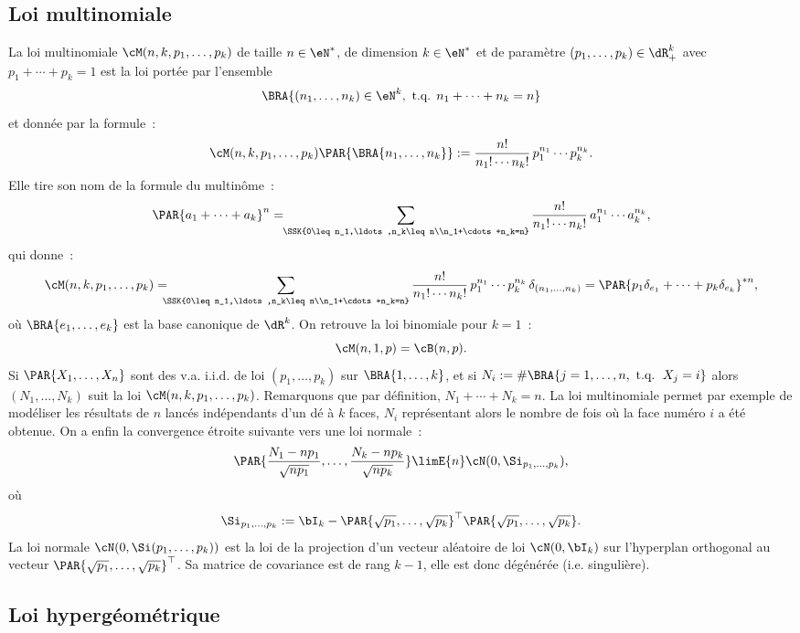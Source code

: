 %
\subsection{Loi multinomiale}\label{ss:loi:multinomiale}
%

La loi multinomiale $\cM(n,k,p_1,\ldots,p_k)$ de taille $n\in\eN^*$, de dimension
$k\in\eN^*$ et de paramètre $(p_1,\ldots,p_k)\in\dR_+^k$ 
avec $p_1+\cdots+p_k=1$ est la loi portée par l'ensemble
$$
\BRA{(n_1,\ldots,n_k) \in \eN^k, \text{ t.q. } n_1+\cdots+n_k=n}
$$
et donnée par la formule~:
$$
\cM(n,k,p_1,\ldots,p_k)\PAR{\BRA{n_1,\ldots,n_k}}
:=\frac{n!}{n_1!\cdots n_k!}\,p_1^{n_1}\cdots p_k^{n_k}.
$$
Elle tire son nom de la formule du multinôme~: 
$$
\PAR{a_1+\cdots+a_k}^n=
\!\!\sum_{\SSK{0\leq n_1,\ldots,n_k\leq n\\n_1+\cdots+n_k=n}} 
\frac{n!}{n_1!\cdots n_k!}\,a_1^{n_1}\cdots a_k^{n_k}, 
$$
qui donne~:
$$
\cM(n,k,p_1,\ldots,p_k) = 
\!\!\!\!\sum_{\SSK{0\leq n_1,\ldots,n_k\leq n\\n_1+\cdots+n_k=n}} 
\frac{n!}{n_1!\cdots n_k!}\,p_1^{n_1}\cdots p_k^{n_k} 
\,\delta_{(n_1,\ldots,n_k)} = \PAR{p_1\delta_{e_1}+\cdots+p_k\delta_{e_k}}^{*n},
$$
où $\BRA{e_1,\ldots,e_k}$ est la base canonique de $\dR^k$.
On retrouve la loi binomiale pour $k=1$~: 
$$
\cM(n,1,p)=\cB(n,p).
$$
Si $\PAR{X_1,\ldots,X_n}$ sont des v.a. i.i.d. de loi $(p_1,\ldots,p_k)$ sur 
$\BRA{1,\ldots,k}$, et si 
$N_i:=\#\BRA{j=1,\ldots,n,\text{ t.q. }\, X_j=i}$ 
alors $(N_1,\ldots,N_k)$ suit la loi $\cM(n,k,p_1,\ldots,p_k)$. 
Remarquons que par définition, $N_1+\cdots+N_k=n$. La loi
multinomiale permet par exemple de modéliser les résultats de $n$ lancés
indépendants d'un dé à $k$ faces, $N_i$ représentant alors le nombre de fois
où la face numéro $i$ a été obtenue. On a enfin la convergence étroite
suivante vers une loi normale~:
$$
\PAR{\frac{N_1-np_1}{\sqrt{np_1}},\ldots,\frac{N_k-np_k}{\sqrt{np_k}}}
\limE{n} \cN(0,\Si_{p_1,\ldots,p_k}),
$$
où 
$$
\Si_{p_1,\ldots,p_k}:=\bI_k-\PAR{\sqrt{p_1},\ldots,\sqrt{p_k}}^\top\PAR{\sqrt{p_1},\ldots,\sqrt{p_k}}.
$$
La loi normale $\cN(0,\Si(p_1,\ldots,p_k))$ est la loi de la projection d'un
vecteur aléatoire de loi $\cN(0,\bI_k)$ sur l'hyperplan orthogonal au vecteur
$\PAR{\sqrt{p_1},\ldots,\sqrt{p_k}}^\top$. Sa matrice de covariance est de rang $k-1$,
elle est donc dégénérée (i.e. singulière).

%
\subsection{Loi hypergéométrique}\label{loi:hypergeom}
%

